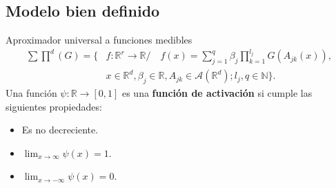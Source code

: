 \documentclass{beamer}
\newcommand{\R}{\mathbb{R}}
\newcommand{\N}{\mathbb{N}}
\newcommand{\afines}{\mathcal{A}(\R^d)}
\begin{document}
\subsection{Modelo bien definido}
\begin{frame}{Aproximador universal a funciones medibles}
    \begin{align*} 
        \sum \prod^d(G) = \{ 
        &f: \R^r \longrightarrow \R / \quad
        f(x) = \sum_{j = 1} ^q  \beta_j \prod_{k=1}^{l_j}
        G(A_{jk}(x)), \\
        &x  \in \R^d, \beta_j \in \R, A_{jk}\in \afines; l_j,q \in \N
        \}.
    \end{align*} 
    \pause
    Una función  $\psi: \R \longrightarrow [0,1]$ 
    es una \textbf{ función de activación} 
    si  cumple las siguientes propiedades:
    \begin{itemize}
        \item Es no decreciente.
        \item $\lim _{x \rightarrow \infty} \psi(x) = 1$.
        \item $\lim _{x \rightarrow -\infty} \psi(x) = 0$.
    \end{itemize}   
\end{frame}
\end{document}
